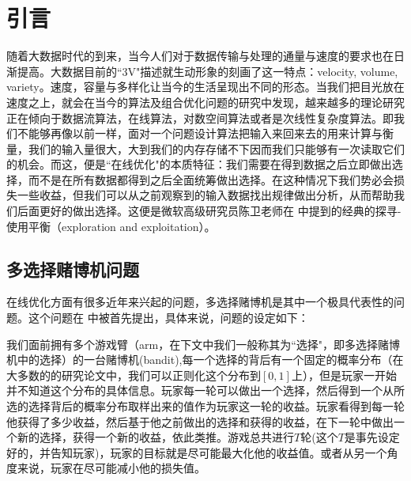 \documentclass[bachelor]{thuthesis}
\begin{document}
\graphicspath{{figures/}}


\frontmatter

\makecover

\tableofcontents

%


\mainmatter

\chapter{引言}
\label{cha:intro}

随着大数据时代的到来，当今人们对于数据传输与处理的通量与速度的要求也在日渐提高。大数据目前的``3V"描述就生动形象的刻画了这一特点：velocity, volume, variety。速度，容量与多样化让当今的生活呈现出不同的形态。当我们把目光放在速度之上，就会在当今的算法及组合优化问题的研究中发现，越来越多的理论研究正在倾向于数据流算法，在线算法，对数空间算法或者是次线性复杂度算法。即我们不能够再像以前一样，面对一个问题设计算法把输入来回来去的用来计算与衡量，我们的输入量很大，大到我们的内存存储不下因而我们只能够有一次读取它们的机会。而这，便是``在线优化"的本质特征：我们需要在得到数据之后立即做出选择，而不是在所有数据都得到之后全面统筹做出选择。在这种情况下我们势必会损失一些收益，但我们可以从之前观察到的输入数据找出规律做出分析，从而帮助我们后面更好的做出选择。这便是微软高级研究员陈卫老师在\cite{cpemab}
中提到的经典的探寻-使用平衡（exploration and exploitation）。


\section{多选择赌博机问题}

在线优化方面有很多近年来兴起的问题，多选择赌博机是其中一个极具代表性的问题。这个问题在
\cite{finite}
中被首先提出，具体来说，问题的设定如下：

我们面前拥有多个游戏臂（arm，在下文中我们一般称其为``选择"，即多选择赌博机中的选择）的一台赌博机(bandit),每一个选择的背后有一个固定的概率分布（在大多数的的研究论文中，我们可以正则化这个分布到$[0,1]$上），但是玩家一开始并不知道这个分布的具体信息。玩家每一轮可以做出一个选择，然后得到一个从所选的选择背后的概率分布取样出来的值作为玩家这一轮的收益。玩家看得到每一轮他获得了多少收益，然后基于他之前做出的选择和获得的收益，在下一轮中做出一个新的选择，获得一个新的收益，依此类推。游戏总共进行$T$轮(这个$T$是事先设定好的，并告知玩家)，玩家的目标就是尽可能最大化他的收益值。或者从另一个角度来说，玩家在尽可能减小他的损失值。
\end{document}
